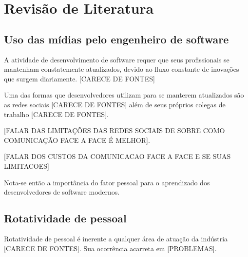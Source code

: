 \chapter{Revisão de Literatura}

\section{Uso das mídias pelo engenheiro de software}

A atividade de desenvolvimento de software requer que seus profissionais se mantenham constatemente atualizados, devido ao fluxo constante de inovações que surgem diariamente. [CARECE DE FONTES]

Uma das formas que desenvolvedores utilizam para se manterem atualizados são as redes sociais [CARECE DE FONTES] além de seus próprios colegas de trabalho [CARECE DE FONTES]. %

[FALAR DAS LIMITAÇÕES DAS REDES SOCIAIS DE SOBRE COMO COMUNICAÇÃO FACE A FACE É MELHOR].

[FALAR DOS CUSTOS DA COMUNICACAO FACE A FACE E SE SUAS LIMITACOES]

Nota-se então a importância do fator pessoal para o aprendizado dos desenvolvedores de software modernos.



\section{Rotatividade de pessoal}

Rotatividade de pessoal é inerente a qualquer área de atuação da indústria [CARECE DE FONTES]. 
Sua ocorrência acarreta em [PROBLEMAS].

